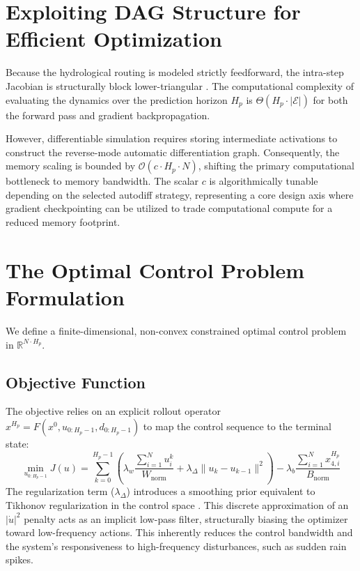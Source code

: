 \documentclass[11pt, a4paper]{article}
\begin{document}
\section{Exploiting DAG Structure for Efficient Optimization}
\label{sec:dag_structure}
Because the hydrological routing is modeled strictly feedforward, the intra-step Jacobian is structurally block lower-triangular . The computational complexity of evaluating the dynamics over the prediction horizon $H_p$ is $\Theta(H_p \cdot |\mathcal{E}|)$ for both the forward pass and gradient backpropagation. 

However, differentiable simulation requires storing intermediate activations to construct the reverse-mode automatic differentiation graph. Consequently, the memory scaling is bounded by $\mathcal{O}(c \cdot H_p \cdot N)$, shifting the primary computational bottleneck to memory bandwidth. The scalar $c$ is algorithmically tunable depending on the selected autodiff strategy, representing a core design axis where gradient checkpointing can be utilized to trade computational compute for a reduced memory footprint.

\section{The Optimal Control Problem Formulation}
\label{sec:ocp}
We define a finite-dimensional, non-convex constrained optimal control problem in $\mathbb{R}^{N \cdot H_p}$. 

\subsection{Objective Function}
The objective relies on an explicit rollout operator $x^{H_p} = F(x^0, u_{0:H_p-1}, d_{0:H_p-1})$ to map the control sequence to the terminal state:
\begin{equation}
    \min_{u_{0:H_p-1}} J(u) = \sum_{k=0}^{H_p-1} \left( \lambda_w \frac{\sum_{i=1}^N u_i^k}{W_{\text{norm}}} + \lambda_{\Delta} \|u_k - u_{k-1}\|^2 \right) - \lambda_b \frac{\sum_{i=1}^N x_{4, i}^{H_p}}{B_{\text{norm}}}
\end{equation}
The regularization term ($\lambda_{\Delta}$) introduces a smoothing prior equivalent to Tikhonov regularization in the control space . This discrete approximation of an $|\dot{u}|^2$ penalty acts as an implicit low-pass filter, structurally biasing the optimizer toward low-frequency actions. This inherently reduces the control bandwidth and the system's responsiveness to high-frequency disturbances, such as sudden rain spikes.
\end{document}
